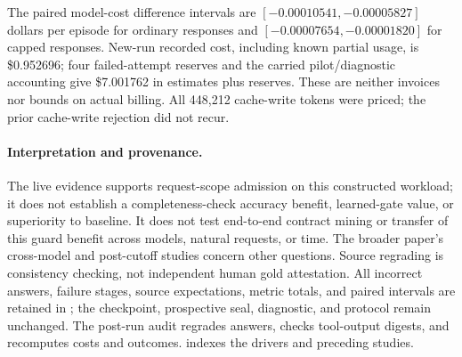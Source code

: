 The paired model-cost difference intervals are
$[-0.00010541,-0.00005827]$ dollars per episode for ordinary responses and
$[-0.00007654,-0.00001820]$ for capped responses. New-run recorded cost,
including known partial usage, is \$0.952696; four failed-attempt reserves and
the carried pilot/diagnostic accounting give \$7.001762 in estimates plus
reserves. These are neither invoices nor bounds on actual billing. All 448{,}212
cache-write tokens were priced; the prior cache-write rejection did not recur.

\paragraph{Interpretation and provenance.}
The live evidence supports request-scope admission on this constructed workload;
it does not establish a completeness-check accuracy benefit, learned-gate value,
or superiority to baseline. It does not test end-to-end contract mining or
transfer of this guard benefit across models, natural requests, or time. The
broader paper's cross-model and post-cutoff studies concern other questions.
Source regrading is consistency checking, not independent human gold attestation.
All incorrect answers, failure stages, source expectations, metric totals, and
paired intervals are retained in
; the checkpoint,
prospective seal, diagnostic, and protocol remain unchanged. The post-run audit
regrades answers, checks tool-output digests, and recomputes costs and outcomes.
 indexes the drivers and preceding studies.
